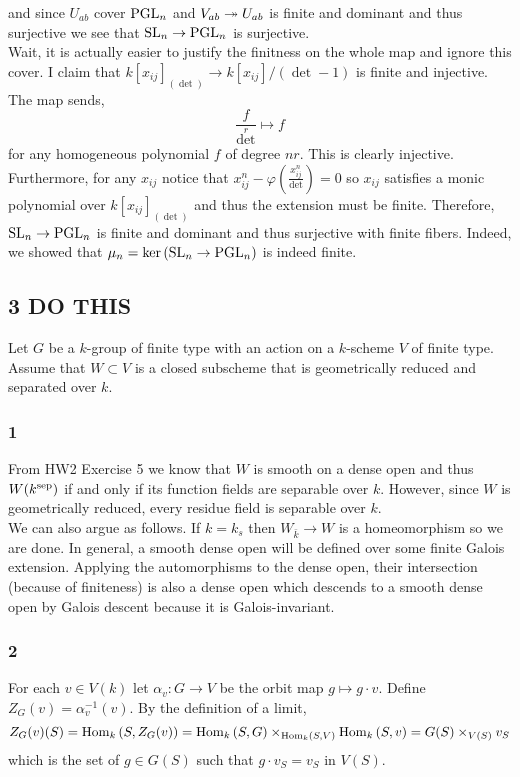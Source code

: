 \documentclass[12pt]{article}
\begin{document}
and since $U_{ab}$ cover $\mathrm{PGL}_n$ and $V_{ab} \twoheadrightarrow U_{ab}$ is finite and dominant and thus surjective we see that $\mathrm{SL}_n \to \mathrm{PGL}_n$ is surjective. 
\bigskip\\
Wait, it is actually easier to justify the finitness on the whole map and ignore this cover. I claim that $k[x_{ij}]_{(\det)} \to k[x_{ij}]/(\det - 1)$ is finite and injective. The map sends,
\[ \frac{f}{\det^r} \mapsto f \]
for any homogeneous polynomial $f$ of degree $nr$. This is clearly injective. Furthermore, for any $x_{ij}$ notice that $x_{ij}^n - \varphi(\frac{x_{ij}^n}{\det}) = 0$ so $x_{ij}$ satisfies a monic polynomial over $k[x_{ij}]_{(\det)}$ and thus the extension must be finite. Therefore, $\mathrm{SL}_n \to \mathrm{PGL}_n$ is finite and dominant and thus surjective with finite fibers. Indeed, we showed that $\mu_n = \ker{(\mathrm{SL}_n \to \mathrm{PGL}_n)}$ is indeed finite.

\subsection{3 DO THIS}

Let $G$ be a $k$-group of finite type with an action on a $k$-scheme $V$ of finite type. Assume that $W \subset V$ is a closed subscheme that is geometrically reduced and separated over $k$.

\subsubsection{1}

From HW2 Exercise 5 we know that $W$ is smooth on a dense open and thus $W(k^{\mathrm{sep}})$ if and only if its function fields are separable over $k$. However, since $W$ is geometrically reduced, every residue field is separable over $k$.
\bigskip\\
We can also argue as follows. If $k = k_s$ then $W_{\bar{k}} \to W$ is a homeomorphism so we are done. In general, a smooth dense open will be defined over some finite Galois extension. Applying the automorphisms to the dense open, their intersection (because of finiteness) is also a dense open which descends to a smooth dense open by Galois descent because it is Galois-invariant. 

\subsubsection{2}

For each $v \in V(k)$ let $\alpha_v : G \to V$ be the orbit map $g \mapsto g \cdot v$. Define $Z_G(v) = \alpha_v^{-1}(v)$. By the definition of a limit,
\[ Z_G(v)(S) = \mathrm{Hom}_{k} \left( S, Z_G(v) \right) = \mathrm{Hom}_{k} \left( S, G \right) \times_{\mathrm{Hom}_{k} \left( S, V \right)} \mathrm{Hom}_{k} \left( S, v \right) = G(S) \times_{V(S)} v_S \]
which is the set of $g \in G(S)$ such that $g \cdot v_S = v_S$ in $V(S)$.
\end{document}

